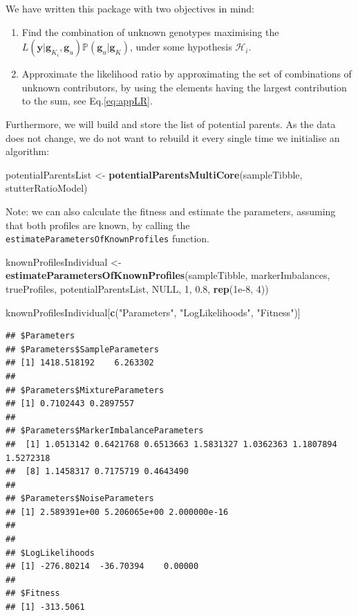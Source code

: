 \documentclass[]{article}
\newenvironment{Shaded}{\begin{snugshade}}{\end{snugshade}}
\newcommand{\KeywordTok}[1]{\textcolor[rgb]{0.13,0.29,0.53}{\textbf{#1}}}
\newcommand{\DecValTok}[1]{\textcolor[rgb]{0.00,0.00,0.81}{#1}}
\newcommand{\FloatTok}[1]{\textcolor[rgb]{0.00,0.00,0.81}{#1}}
\newcommand{\StringTok}[1]{\textcolor[rgb]{0.31,0.60,0.02}{#1}}
\newcommand{\OtherTok}[1]{\textcolor[rgb]{0.56,0.35,0.01}{#1}}
\newcommand{\NormalTok}[1]{#1}
\newcommand{\bs}[1]{\ensuremath{\boldsymbol{#1}}}
\newcommand{\mc}[1]{\ensuremath{\mathcal{#1}}}
\newcommand{\mcg}{\ensuremath{g}}
\newcommand{\p}[1]{\ensuremath{\mathbb{P}\left(#1\right)}}
\begin{document}
We have written this package with two objectives in mind:

\begin{enumerate}[(1)]
\item Find the combination of unknown genotypes maximising the $L\left(\bs{y}|\bs \mcg_{K_i}, \bs \mcg_{u}\right)\p{\bs \mcg_{u}|\bs \mcg_{K}}$, under some hypothesis $\mc H_i$.
\item Approximate the likelihood ratio by approximating the set of combinations of unknown contributors, by using the elements having the largest contribution to the sum, see Eq.\eqref{eq:appLR}.
\end{enumerate}

Furthermore, we will build and store the list of potential parents. As
the data does not change, we do not want to rebuild it every single time
we initialise an algorithm:

\begin{Shaded}
\begin{Highlighting}[]
\NormalTok{potentialParentsList <-}\StringTok{ }\KeywordTok{potentialParentsMultiCore}\NormalTok{(sampleTibble, stutterRatioModel)}
\end{Highlighting}
\end{Shaded}

Note: we can also calculate the fitness and estimate the parameters,
assuming that both profiles are known, by calling the
\texttt{estimateParametersOfKnownProfiles} function.

\begin{Shaded}
\begin{Highlighting}[]
\NormalTok{knownProfilesIndividual <-}\StringTok{ }
\StringTok{    }\KeywordTok{estimateParametersOfKnownProfiles}\NormalTok{(sampleTibble, markerImbalances, trueProfiles, }
\NormalTok{                                      potentialParentsList, }
                                      \OtherTok{NULL}\NormalTok{, }\DecValTok{1}\NormalTok{, }\FloatTok{0.8}\NormalTok{, }\KeywordTok{rep}\NormalTok{(}\FloatTok{1e-8}\NormalTok{, }\DecValTok{4}\NormalTok{))}

\NormalTok{knownProfilesIndividual[}\KeywordTok{c}\NormalTok{(}\StringTok{"Parameters"}\NormalTok{, }\StringTok{"LogLikelihoods"}\NormalTok{, }\StringTok{"Fitness"}\NormalTok{)]}
\end{Highlighting}
\end{Shaded}

\begin{verbatim}
## $Parameters
## $Parameters$SampleParameters
## [1] 1418.518192    6.263302
## 
## $Parameters$MixtureParameters
## [1] 0.7102443 0.2897557
## 
## $Parameters$MarkerImbalanceParameters
##  [1] 1.0513142 0.6421768 0.6513663 1.5831327 1.0362363 1.1807894 1.5272318
##  [8] 1.1458317 0.7175719 0.4643490
## 
## $Parameters$NoiseParameters
## [1] 2.589391e+00 5.206065e+00 2.000000e-16
## 
## 
## $LogLikelihoods
## [1] -276.80214  -36.70394    0.00000
## 
## $Fitness
## [1] -313.5061
\end{verbatim}
\end{document}
